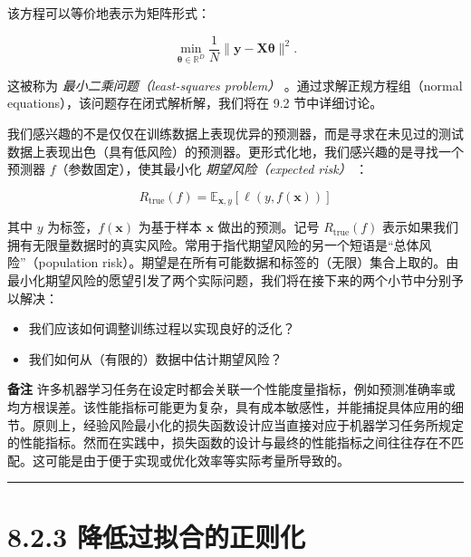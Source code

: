 该方程可以等价地表示为矩阵形式：

\begin{equation}
\min_{\boldsymbol{\theta} \in \mathbb{R}^D} \frac{1}{N} \|\boldsymbol{y} - \boldsymbol{X}\boldsymbol{\theta}\|^2 .
\tag{8.9}\label{eq:8-9}
\end{equation}

这被称为 \emph{最小二乘问题（least-squares problem）} 。通过求解正规方程组（normal equations），该问题存在闭式解析解，我们将在 9.2 节中详细讨论。

我们感兴趣的不是仅仅在训练数据上表现优异的预测器，而是寻求在未见过的测试数据上表现出色（具有低风险）的预测器。更形式化地，我们感兴趣的是寻找一个预测器 $ f $（参数固定），使其最小化 \emph{期望风险（expected risk）} ：

\begin{equation}
R_{\text{true}}(f) = \mathbb{E}_{\boldsymbol{x}, y}[\ell(y, f(\boldsymbol{x}))]
\tag{8.10}\label{eq:8-10}
\end{equation}

其中 $ y $ 为标签，$ f(\boldsymbol{x}) $ 为基于样本 $ \boldsymbol{x} $ 做出的预测。记号 $ R_{\text{true}}(f) $ 表示如果我们拥有无限量数据时的真实风险。常用于指代期望风险的另一个短语是“总体风险”（population risk）。期望是在所有可能数据和标签的（无限）集合上取的。由最小化期望风险的愿望引发了两个实际问题，我们将在接下来的两个小节中分别予以解决：

\begin{itemize}
\item 我们应该如何调整训练过程以实现良好的泛化？
\item 我们如何从（有限的）数据中估计期望风险？
\end{itemize}

\begin{notebox}
\textbf{备注} 许多机器学习任务在设定时都会关联一个性能度量指标，例如预测准确率或均方根误差。该性能指标可能更为复杂，具有成本敏感性，并能捕捉具体应用的细节。原则上，经验风险最小化的损失函数设计应当直接对应于机器学习任务所规定的性能指标。然而在实践中，损失函数的设计与最终的性能指标之间往往存在不匹配。这可能是由于便于实现或优化效率等实际考量所导致的。
\end{notebox}

\medskip\hrule\medskip

\section*{8.2.3 降低过拟合的正则化}

